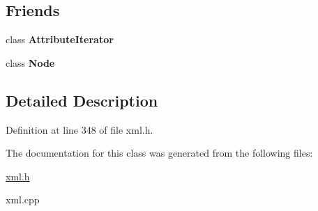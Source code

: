 \subsection*{Friends}
\begin{DoxyCompactItemize}
\item 
\hypertarget{classphys_1_1xml_1_1Attribute_a1ed8790083a80b2604beba1c666bce6e}{
class {\bfseries AttributeIterator}}
\label{da/ddf/classphys_1_1xml_1_1Attribute_a1ed8790083a80b2604beba1c666bce6e}

\item 
\hypertarget{classphys_1_1xml_1_1Attribute_a6db9d28bd448a131448276ee03de1e6d}{
class {\bfseries Node}}
\label{da/ddf/classphys_1_1xml_1_1Attribute_a6db9d28bd448a131448276ee03de1e6d}

\end{DoxyCompactItemize}


\subsection{Detailed Description}


Definition at line 348 of file xml.h.



The documentation for this class was generated from the following files:\begin{DoxyCompactItemize}
\item 
\hyperlink{xml_8h}{xml.h}\item 
xml.cpp\end{DoxyCompactItemize}
